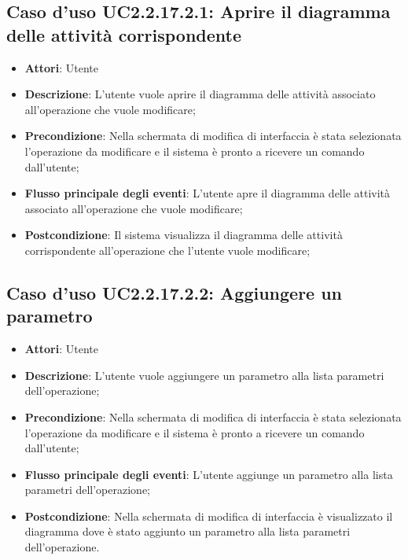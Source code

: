 \documentclass[../AnalisiDeiRequisiti.tex]{subfiles}
\begin{document}
				\subsection{Caso d'uso UC2.2.17.2.1: Aprire il diagramma delle attività corrispondente}
				\begin{itemize}
					\item \textbf{Attori}: Utente
					\item \textbf{Descrizione}: L'utente vuole aprire il diagramma delle attività associato all'operazione che vuole modificare;
					\item \textbf{Precondizione}: Nella schermata di modifica di interfaccia è stata selezionata l'operazione da modificare e il sistema è pronto a ricevere un comando dall'utente;
					\item \textbf{Flusso principale degli eventi}: L'utente apre il diagramma delle attività associato all'operazione che vuole modificare;
					\item \textbf{Postcondizione}: Il sistema visualizza il diagramma delle attività corrispondente all'operazione che l'utente vuole modificare;
				\end{itemize}
				\subsection{Caso d'uso UC2.2.17.2.2: Aggiungere un parametro}
				\begin{itemize}
					\item \textbf{Attori}: Utente
					\item \textbf{Descrizione}: L'utente vuole aggiungere un parametro alla lista parametri dell'operazione;
					\item \textbf{Precondizione}: Nella schermata di modifica di interfaccia è stata selezionata l'operazione da modificare e il sistema è pronto a ricevere un comando dall'utente;
					\item \textbf{Flusso principale degli eventi}: L'utente aggiunge un parametro alla lista parametri dell'operazione;
					\item \textbf{Postcondizione}: Nella schermata di modifica di interfaccia è visualizzato il diagramma dove è stato aggiunto un parametro alla lista parametri dell'operazione.
				\end{itemize}
\end{document}
